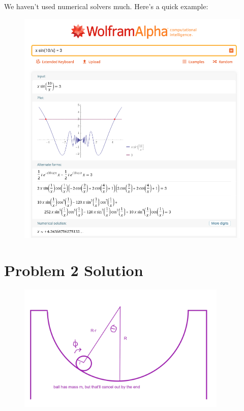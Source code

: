 \documentclass{article}
\begin{document}
\newpage

We haven't used numerical solvers much. Here's a quick example:

\begin{figure}[h]
\includegraphics[width=12cm]{wolfram-solver-example.png}
\centering
\end{figure}

\newpage

\section*{Problem 2 Solution}


\begin{figure}[h]
\includegraphics[width=10cm]{half-pipe.png}
\centering
\end{figure}
\end{document}
